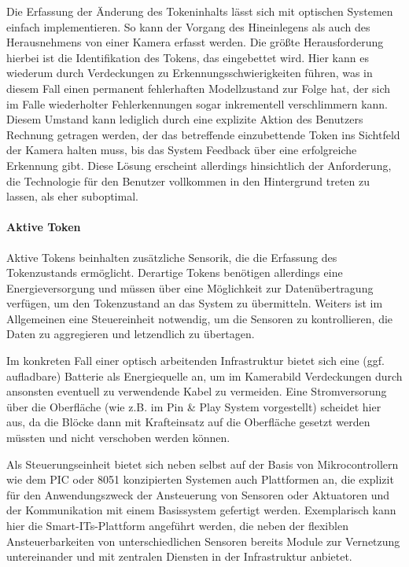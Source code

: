 Die Erfassung der Änderung des Tokeninhalts lässt sich mit optischen Systemen einfach implementieren. So kann der Vorgang des Hineinlegens als auch des Herausnehmens von einer Kamera erfasst werden. Die größte Herausforderung hierbei ist die Identifikation des Tokens, das eingebettet wird. Hier kann es wiederum durch Verdeckungen zu Erkennungsschwierigkeiten führen, was in diesem Fall einen permanent fehlerhaften Modellzustand zur Folge hat, der sich im Falle wiederholter Fehlerkennungen sogar inkrementell verschlimmern kann. Diesem Umstand kann lediglich durch eine explizite Aktion des Benutzers Rechnung getragen werden, der das betreffende einzubettende Token ins Sichtfeld der Kamera halten muss, bis das System Feedback über eine erfolgreiche Erkennung gibt. Diese Lösung erscheint allerdings hinsichtlich der Anforderung, die Technologie für den Benutzer vollkommen in den Hintergrund treten zu lassen, als eher suboptimal.


\paragraph{Aktive Token} %
\label{par:aktive_token}

Aktive Tokens beinhalten zusätzliche Sensorik, die die Erfassung des Tokenzustands ermöglicht. Derartige Tokens benötigen allerdings eine Energieversorgung und müssen über eine Möglichkeit zur Datenübertragung verfügen, um den Tokenzustand an das System zu übermitteln. Weiters ist im Allgemeinen eine Steuereinheit notwendig, um die Sensoren zu kontrollieren, die Daten zu aggregieren und letzendlich zu übertagen.

Im konkreten Fall einer optisch arbeitenden Infrastruktur bietet sich eine (ggf. aufladbare) Batterie als Energiequelle an, um im Kamerabild Verdeckungen durch ansonsten eventuell zu verwendende Kabel zu vermeiden. Eine Stromversorung über die Oberfläche (wie z.B. im Pin \& Play System \citep{Van-Laerhoven03} vorgestellt) scheidet hier aus, da die Blöcke dann mit Krafteinsatz auf die Oberfläche gesetzt werden müssten und nicht verschoben werden können. 

Als Steuerungseinheit bietet sich neben selbst auf der Basis von Mikrocontrollern wie dem PIC oder 8051 \citep{James97} konzipierten Systemen auch Plattformen an, die explizit für den Anwendungszweck der Ansteuerung von Sensoren oder Aktuatoren und der Kommunikation mit einem Basissystem gefertigt werden. Exemplarisch kann hier die Smart-ITs-Plattform \cite{Gellersen04} angeführt werden, die neben der flexiblen Ansteuerbarkeiten von unterschiedlichen Sensoren bereits Module zur Vernetzung untereinander und mit zentralen Diensten in der Infrastruktur anbietet.

